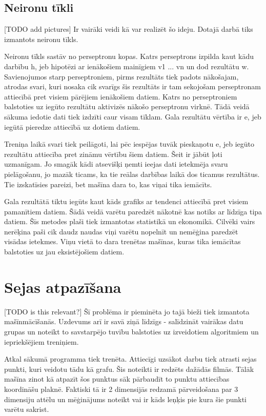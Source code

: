 \subsection{Neironu tīkli}
[TODO add pictures]
Ir vairāki veidi kā var realizēt šo ideju. Dotajā darbā tiks izmantots neironu tīkls.

Neironu tīkls sastāv no perseptronu kopas. Katrs perseptrons izpilda kaut kādu darbību h, jeb hipotēzi ar ienākošiem mainīgiem v1 ... vn un dod rezultātu w. Savienojumos starp perseptroniem, pirms rezultāts tiek padots nākošajam, atrodas svari, kuri nosaka cik svarīgs šis rezultāts ir tam sekojošam perseptronam attiecībā pret visiem pārējiem ienākošiem datiem. Katrs no perseptroniem balstoties uz iegūto rezultātu aktivizēs nākošo perseptronu virknē. Tādā veidā sākuma iedotie dati tiek izdzīti caur visam tīklam. Gala rezultātu vērtība ir e, jeb iegūtā pieredze attiecībā uz dotiem datiem.

Treniņa laikā svari tiek peilāgoti, lai pēc iespējas tuvāk pieskaņotu e, jeb iegūto rezultātu attiecība pret zināmu vērtību šiem datiem. Šeit ir jābūt ļoti uzmanīgam. Jo smagāk kādi atsevišķi ņemti ieejas dati ietekmēja svaru pielāgošanu, jo mazāk ticams, ka tie reālas darbības laikā dos ticamus rezultātus. Tie izskatīsies pareizi, bet mašīna dara to, kas viņai tika iemācīts.

Gala rezultātā tiktu iegūts kaut kāds grafiks ar tendenci attiecībā pret visiem pamanītiem datiem. Šādā veidā varētu paredzēt nākotnē kas notiks ar līdzīga tipa datiem. Šīs metodes plaši tiek izmantotas statistikā un ekonomikā. Cilvēki vairs nerēķina paši cik daudz naudas viņi varētu nopelnīt un nemēģina paredzēt visādas ietekmes. Viņu vietā to dara trenētas mašīnas, kuras tika iemācītas balstoties uz jau eksistējošiem datiem.

\section{Sejas atpazīšana}
[TODO is this relevant?]
Šī problēma ir pieminēta jo tajā bieži tiek izmantota mašīnmācīšanās. Uzdevums arī ir savā ziņā līdzīgs - salīdzināt vairākas datu grupas un noteikt to savstarpējo tuvību balstoties uz izveidotiem algoritmiem un iepriekšējiem treniņiem.

Atkal sākumā programma tiek trenēta. Attiecīgi uzsākot darbu tiek atrasti sejas punkti, kuri veidotu tādu kā grafu. Šis noteikti ir redzēts dažādās filmās. Tālāk mašīna zinot kā atpazīt šos punktus sāk pārbaudīt to punktu attiecības koordināšu plaknē. Faktiski tā ir 2 dimensijās redzamā pārveidošana par 3 dimensiju attēlu un mēģinājums noteikt vai ir kāds leņķis pie kura šie punkti varētu sakrist.

